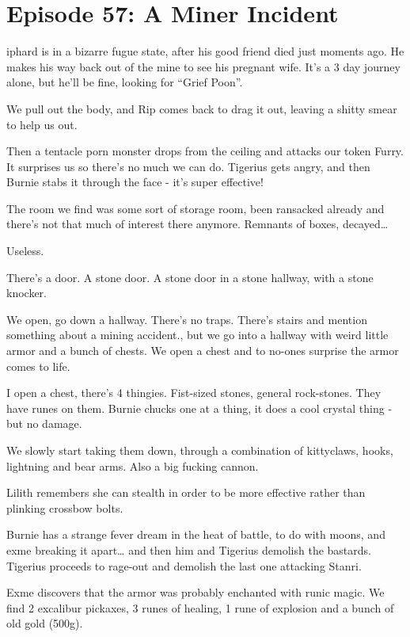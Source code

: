 \section{Episode 57: A Miner Incident}

\medskip

iphard is in a bizarre fugue state, after his good friend died just moments ago. He makes his way back out of the mine to see his pregnant wife. It’s a 3 day journey alone, but he’ll be fine, looking for “Grief Poon”.\medskip

We pull out the body, and Rip comes back to drag it out, leaving a shitty smear to help us out.\medskip

Then a tentacle porn monster drops from the ceiling and attacks our token Furry. It surprises us so there’s no much we can do. Tigerius gets angry, and then Burnie stabs it through the face - it’s super effective!\medskip

The room we find was some sort of storage room, been ransacked already and there’s not that much of interest there anymore. Remnants of boxes, decayed…\medskip

Useless.\medskip

There’s a door. A stone door. A stone door in a stone hallway, with a stone knocker.\medskip

We open, go down a hallway. There’s no traps. There’s stairs and mention something about a mining accident., but we go into a hallway with weird little armor and a bunch of chests. We open a chest and to no-ones surprise the armor comes to life.\medskip

I open a chest, there’s 4 thingies. Fist-sized stones, general rock-stones. They have runes on them. Burnie chucks one at a thing, it does a cool crystal thing - but no damage.\medskip

We slowly start taking them down, through a combination of kittyclaws, hooks, lightning and bear arms. Also a big fucking cannon.\medskip

Lilith remembers she can stealth in order to be more effective rather than plinking crossbow bolts.\medskip

Burnie has a strange fever dream in the heat of battle, to do with moons, and exme breaking it apart… and then him and Tigerius demolish the bastards. Tigerius proceeds to rage-out and demolish the last one attacking Stanri.\medskip

Exme discovers that the armor was probably enchanted with runic magic. We find 2 excalibur pickaxes, 3 runes of healing, 1 rune of explosion and a bunch of old gold (500g).\medskip


